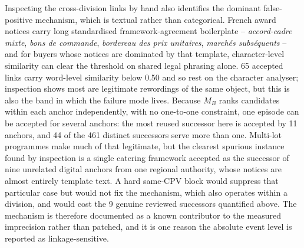 \documentclass[11pt,a4paper]{article}
\begin{document}
Inspecting the cross-division links by hand also identifies the dominant
false-positive mechanism, which is textual rather than categorical. French
award notices carry long standardised framework-agreement boilerplate --
\emph{accord-cadre mixte}, \emph{bons de commande}, \emph{bordereau des prix
unitaires}, \emph{marchés subséquents} -- and for buyers whose notices are
dominated by that template, character-level similarity can clear the threshold on
shared legal phrasing alone.
65 accepted links
carry word-level similarity below
0.50 and so rest on the
character analyser; inspection shows most are legitimate rewordings of the same
object, but this is also the band in which the failure mode lives. Because
\(M_B\) ranks candidates within each anchor independently, with no one-to-one
constraint, one episode can be accepted for several anchors: the most reused
successor here is accepted by
11 anchors, and
44 of the
461 distinct successors serve more than one.
Multi-lot programmes make much of that legitimate, but the clearest spurious
instance found by inspection is a single catering framework accepted as the
successor of nine unrelated digital anchors from one regional authority, whose
notices are almost entirely template text.
A hard same-CPV block would suppress that particular case but would not fix the
mechanism, which also operates within a division, and would cost the
9 genuine
reviewed successors quantified above. The mechanism is therefore documented as a
known contributor to the measured imprecision rather than patched, and it is one
reason the absolute event level is reported as linkage-sensitive.
\end{document}
